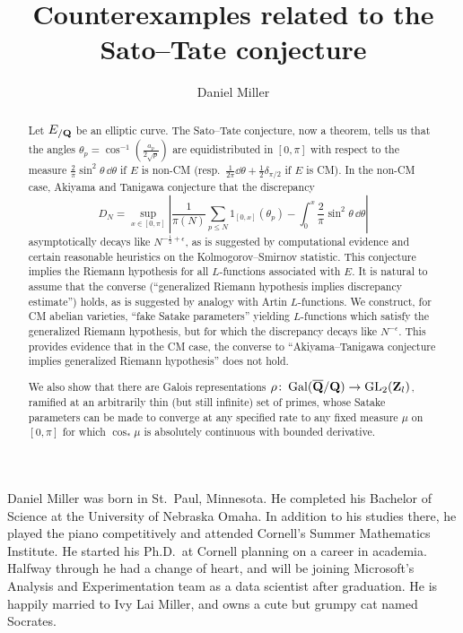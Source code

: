 \documentclass[phd,tocprelim]{cornell}
\title{Counterexamples related to the Sato--Tate conjecture}
\author{Daniel Miller}
\begin{document}
\maketitle
\makecopyright





\begin{abstract}
Let $E_{/\mathbf{Q}}$ be an elliptic curve. The Sato--Tate conjecture, now a theorem, 
tells us that the angles $\theta_p =\cos^{-1}\left(\frac{a_p}{2\sqrt p}\right)$ 
are equidistributed in $[0,\pi]$ with respect to the measure 
$\frac{2}{\pi}\sin^2\theta\, \dd\theta$ if $E$ is non-CM
(resp.~$\frac{1}{2\pi} \dd \theta + \frac 1 2 \delta_{\pi/2}$ if $E$ is CM). 
In the non-CM case, Akiyama and Tanigawa conjecture that the discrepancy 
\[
	D_N = \sup_{x\in [0,\pi]} \left| \frac{1}{\pi(N)} \sum_{p\leqslant N} 1_{[0,x]}(\theta_p) - \int_0^x \frac{2}{\pi}\sin^2\theta\, \dd\theta\right| 
\]
asymptotically decays like $N^{-\frac 1 2+\epsilon}$, as is suggested by computational 
evidence and certain reasonable heuristics on the Kolmogorov--Smirnov 
statistic. This conjecture implies the Riemann hypothesis 
for all $L$-functions associated with $E$. It is natural to assume that the 
converse (``generalized Riemann hypothesis implies discrepancy estimate'') holds, 
as is suggested by analogy with Artin $L$-functions. We construct, for CM abelian 
varieties, ``fake Satake parameters'' yielding $L$-functions which satisfy 
the generalized Riemann hypothesis, but for which the discrepancy decays like 
$N^{-\epsilon}$. This provides evidence that in the CM case, the converse to 
``Akiyama--Tanigawa conjecture implies generalized Riemann hypothesis'' does 
not hold. 

We also show that there are Galois representations 
$\rho\colon \operatorname{Gal}(\overline {\mathbf{Q}} /\mathbf{Q}) \to \operatorname{GL}_2(\mathbf{Z}_l)$, ramified at an 
arbitrarily thin (but still infinite) set of primes, whose Satake parameters 
can be made to converge at any specified rate to any fixed measure $\mu$ on 
$[0,\pi]$ for which $\cos_\ast\mu$ is absolutely continuous with bounded 
derivative. 
\end{abstract}





\begin{biosketch}
Daniel Miller was born in St.~Paul, Minnesota. He completed his Bachelor of 
Science at the University of Nebraska Omaha. In addition to his studies there, 
he played the piano competitively and attended Cornell's Summer Mathematics 
Institute. He started his Ph.D.~at Cornell planning on a career in academia. 
Halfway through he had a change of heart, and will be joining Microsoft's 
Analysis and Experimentation team as a data scientist after graduation. He is 
happily married to Ivy Lai Miller, and owns a cute but grumpy cat named Socrates. 
\end{biosketch}
\end{document}

